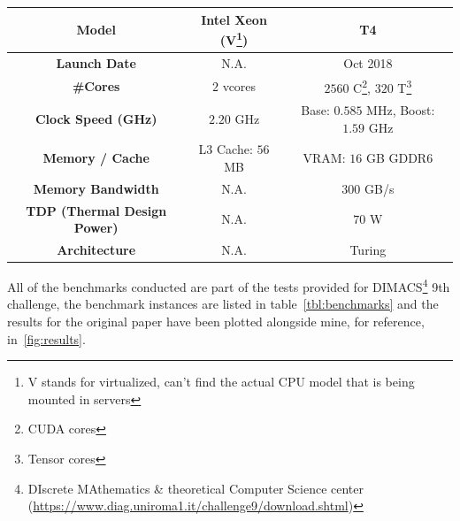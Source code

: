 \documentclass[a4paper,10pt]{article}
\begin{document}
\begin{center}
\begin{longtable}{|c|c|c|}
		\textbf{Model}                      & Intel Xeon (V\footnote{V stands for virtualized, can't find the actual CPU model that is being mounted in servers}) & T4                                                                  \\\hline
		\textbf{Launch Date}                & N.A.                                                                                                                & Oct 2018                                                            \\\hline
		\textbf{\#Cores}                    & $2$ vcores                                                                                                          & $\num{2560}$ C\footnote{CUDA cores}, $320$ T\footnote{Tensor cores} \\\hline
		\textbf{Clock Speed (GHz)}          & $\num{2.20}$ GHz                                                                                                    & Base: $0.585$ MHz, Boost: $1.59$ GHz                                \\\hline
		\textbf{Memory / Cache}             & L3 Cache: $56$ MB                                                                                                   & VRAM: $16$ GB GDDR6                                                 \\\hline
		\textbf{Memory Bandwidth}           & N.A.                                                                                                                & 300 GB/s                                                            \\\hline
		\textbf{TDP (Thermal Design Power)} & N.A.                                                                                                                & $70$ W                                                              \\\hline
		\textbf{Architecture}               & N.A.                                                                                                                & Turing
	\end{longtable}
\end{center}
All of the benchmarks conducted are part of the tests provided for DIMACS\footnote{DIscrete
	MAthematics \& theoretical Computer Science center
	(\url{https://www.diag.uniroma1.it/challenge9/download.shtml})} 9th challenge, the benchmark
instances are listed in table~\ref{tbl:benchmarks} and the results for the original paper have been
plotted alongside mine, for reference, in~\ref{fig:results}.
\end{document}
